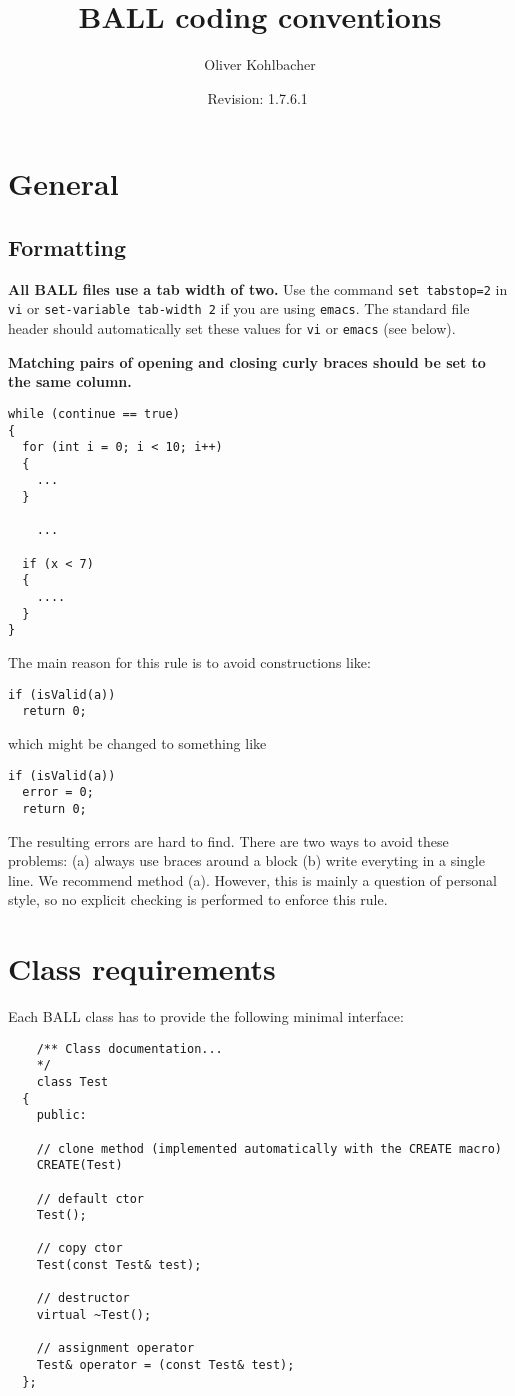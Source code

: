 \documentclass[a4paper,10pt]{article}
\title{BALL coding conventions}
\author{Oliver Kohlbacher}
\date{$ $Revision: 1.7.6.1 $ $}
\begin{document}
\maketitle

\section{General}

\subsection{Formatting}

{\bf All BALL files use a tab width of two.} Use the command {\tt set tabstop=2} in
{\tt vi} or {\tt set-variable tab-width 2} if you are using {\tt emacs}. The
standard file header should automatically set these values for {\tt vi} or
{\tt emacs} (see below).

\noindent
{\bf Matching pairs of opening and closing curly braces should be set to the same
column.}

\begin{verbatim}
while (continue == true)
{
  for (int i = 0; i < 10; i++)
  {
    ...
  }

 	...

  if (x < 7)
  {
    ....
  }
}
\end{verbatim}
The main reason for this rule is to avoid constructions like:

\begin{verbatim}
if (isValid(a))
  return 0;
\end{verbatim}

\noindent
which might be changed to something like

\begin{verbatim}
if (isValid(a))
  error = 0;
  return 0;
\end{verbatim}

The resulting errors are hard to find. There are two ways to avoid these
problems: (a) always use braces around a block (b) write everyting in a single
line. We recommend method (a).
However, this is mainly a question of personal style, so no explicit checking
is performed to enforce this rule.



\section{Class requirements}

Each BALL class has to provide the following minimal interface:
\begin{verbatim}
	/** Class documentation... 
	*/
	class Test
  {
    public:

    // clone method (implemented automatically with the CREATE macro)
    CREATE(Test)    

    // default ctor
    Test();

    // copy ctor 
    Test(const Test& test);

    // destructor 
    virtual ~Test();
 
    // assignment operator
    Test& operator = (const Test& test);
  };
\end{verbatim}
\end{document}

